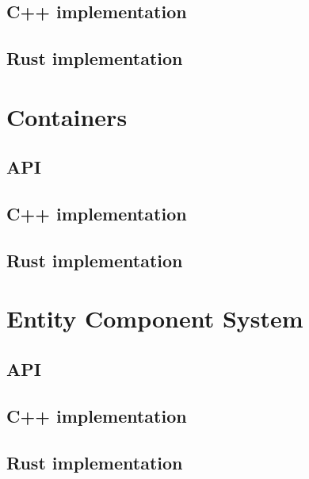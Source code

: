 \subsection{C++ implementation}
\blindtext
\subsection{Rust implementation}
\blindtext
\section{Containers} \label{container_impl}
\blindtext
\subsection{API}
\blindtext
\subsection{C++ implementation}
\blindtext
\subsection{Rust implementation}
\blindtext
\section{Entity Component System} \label{ecs_impl}
\blindtext
\subsection{API}
\blindtext
\subsection{C++ implementation}
\blindtext
\subsection{Rust implementation}
\blindtext